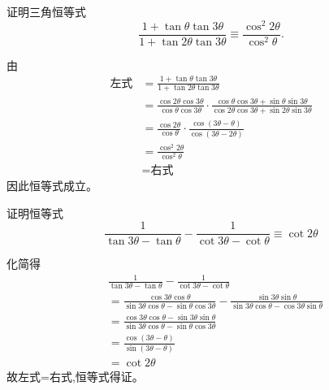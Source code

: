 \begin{questions}
    \question 证明三角恒等式
    \[
    \frac{1 + \tan \theta \tan 3\theta}{1 + \tan 2\theta \tan 3\theta} \equiv \frac{\cos^2 2\theta}{\cos^2 \theta}.
    \]
    \begin{solution}
        由
        \begin{align*}
        \text{左式} &= \frac{1 + \tan \theta \tan 3\theta}{1 + \tan 2\theta \tan 3\theta} \\
        &= \frac{\cos 2\theta \cos 3\theta}{\cos \theta \cos 3\theta} \cdot \frac{\cos \theta \cos 3\theta+\sin \theta \sin 3\theta}{\cos 2\theta \cos 3\theta+ \sin 2\theta \sin 3\theta} \\
        &= \frac{\cos 2\theta}{\cos \theta} \cdot \frac{\cos(3\theta - \theta)}{\cos(3\theta - 2\theta)}  \\
        &= \frac{\cos^2 2\theta}{\cos^2 \theta} \\
        &= \text{右式}
        \end{align*}
        因此恒等式成立。
    \end{solution}
    
    \question 证明恒等式
    \[
    \frac{1}{\tan 3\theta - \tan \theta} - \frac{1}{\cot 3\theta - \cot \theta} \equiv \cot 2\theta
    \]
    \begin{solution}
        化简得
        \begin{align*}
        &\frac{1}{\tan 3\theta - \tan \theta} - \frac{1}{\cot 3\theta - \cot \theta} \\
        &= \frac{\cos 3\theta \cos \theta}{\sin 3\theta \cos \theta - \sin \theta \cos 3\theta} - \frac{\sin 3\theta \sin \theta}{\sin 3\theta \cos \theta - \cos 3\theta \sin \theta} \\
        &= \frac{\cos 3\theta \cos \theta - \sin 3\theta \sin \theta}{\sin 3\theta \cos \theta - \sin \theta \cos 3\theta} \\
        &= \frac{\cos(3\theta - \theta)}{\sin(3\theta - \theta)} \\
        &= \cot 2\theta
        \end{align*}
        故左式=右式,恒等式得证。
    \end{solution}


\end{questions}
